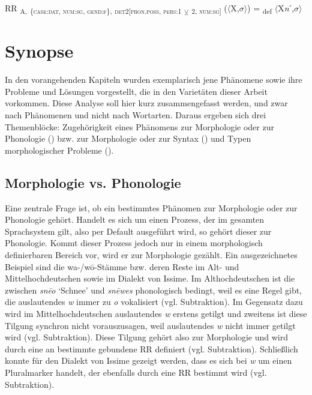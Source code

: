 \ea%
\label{ex:key:169}
 RR \textsubscript{A,} \textsubscript{\{\textsc{case:dat}, \textsc{num:sg}, \textsc{gend:f}\},} \textsubscript{\textsc{det2[pron.poss}, \textsc{pers:1}} \textsubscript{\tiny $\veebar$}\textsubscript{ 2, \textsc{num:sg}]} ($\langle$X,$\sigma$$\rangle$) = \textsubscript{def} $\langle$X\textit{n}ˊ,$\sigma$$\rangle$
\z

\section{Synopse}\label{5.7}

In den vorangehenden Kapiteln wurden exemplarisch jene Phänomene sowie ihre Probleme und Lösungen vorgestellt, die in den Varietäten dieser Arbeit vorkommen. Diese Analyse soll hier kurz zusammengefasst werden, und zwar nach Phänomenen und nicht nach Wortarten. Daraus ergeben sich drei Themenblöcke: Zugehörigkeit eines Phänomens zur Morphologie oder zur Phonologie () bzw. zur Morphologie oder zur Syntax () und Typen morphologischer Probleme ().

\subsection{Morphologie vs. Phonologie}\label{5.7.1}

Eine zentrale Frage ist, ob ein bestimmtes Phänomen zur Morphologie oder zur Phonologie gehört. Handelt es sich um einen Prozess, der im gesamten Sprachsystem gilt, also per Default ausgeführt wird, so gehört dieser zur Phonologie. Kommt dieser Prozess jedoch nur in einem morphologisch definierbaren Bereich vor, wird er zur Morphologie gezählt. Ein ausgezeichnetes Beispiel sind die wa-/w\=o{}-Stäm\-me bzw. deren Reste im Alt- und Mittelhochdeutschen sowie im Dialekt von Issime. Im Althochdeutschen ist die  zwischen \textit{sn\=e}\textit{o} ‘Schnee’ und \textit{sn\=e}\textit{wes} phonologisch bedingt, weil es eine Regel gibt, die auslautendes \textit{w} immer zu \textit{o} vokalisiert (vgl.  Subtraktion). Im Gegensatz dazu wird im Mittelhochdeutschen auslautendes \textit{w} erstens getilgt und zweitens ist diese Tilgung synchron nicht vorauszusagen, weil auslautendes \textit{w} nicht immer getilgt wird (vgl.  Subtraktion). Diese Tilgung gehört also zur Morphologie und wird durch eine an bestimmte  gebundene RR definiert (vgl.  Subtraktion). Schließlich konnte für den Dialekt von Issime gezeigt werden, dass es sich bei \textit{w} um einen Pluralmarker handelt, der ebenfalls durch eine RR bestimmt wird (vgl.  Subtraktion).


